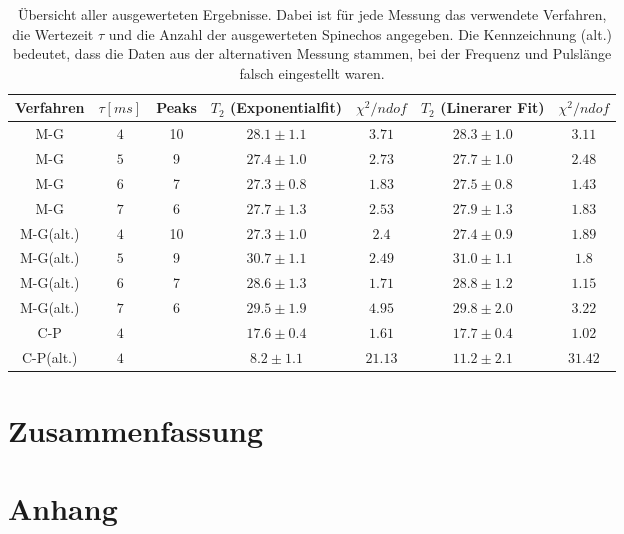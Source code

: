 \documentclass[12pt,a4paper]{article}
\begin{document}
\begin{table}
\begin{tabular}{|c|c|c||c|c||c|c|}
\hline
Verfahren & $\tau [ms]$ & Peaks &  $T_2$ (Exponentialfit) & $\chi^2/ndof$ &$T_2$ (Linerarer Fit) & $\chi^2/ndof$\\
\hline
M-G & $4$ & 10 & $ 28.1 \pm 1.1 $ & $ 3.71 $ & $ 28.3 \pm 1.0 $ & $ 3.11 $ \\
\hline
M-G & $5$ & 9 & $ 27.4 \pm 1.0 $ & $ 2.73 $ & $ 27.7 \pm 1.0 $ & $ 2.48 $ \\
\hline
M-G & $6$ & 7 & $ 27.3 \pm 0.8 $ & $ 1.83 $ & $ 27.5 \pm 0.8 $ & $ 1.43 $ \\
\hline
M-G & $7$ & 6 & $ 27.7 \pm 1.3 $ & $ 2.53 $ & $ 27.9 \pm 1.3 $ & $ 1.83 $ \\
\hline
\hline
M-G(alt.) & $4$ & 10 & $ 27.3 \pm 1.0 $ & $ 2.4 $ & $ 27.4 \pm 0.9 $ & $ 1.89 $ \\
\hline
M-G(alt.) & $5$ & 9 & $ 30.7 \pm 1.1 $ & $ 2.49 $ & $ 31.0 \pm 1.1 $ & $ 1.8 $ \\
\hline
M-G(alt.) & $6$ & 7 & $ 28.6 \pm 1.3 $ & $ 1.71 $ & $ 28.8 \pm 1.2 $ & $ 1.15 $ \\
\hline
M-G(alt.) & $7$ & 6 & $ 29.5 \pm 1.9 $ & $ 4.95 $ & $ 29.8 \pm 2.0 $ & $ 3.22 $ \\
\hline
\hline
C-P & $4$ &  & $17.6\pm 0.4$ & $1.61$ & $17.7\pm 0.4$ & $1.02$\\
\hline
C-P(alt.) & $4$ &  & $ 8.2 \pm 1.1 $ & $ 21.13 $ & $ 11.2 \pm 2.1 $ & $ 31.42 $ \\
\hline
\end{tabular}
\caption{Übersicht aller ausgewerteten Ergebnisse. Dabei ist für jede Messung das verwendete Verfahren, die Wertezeit $\tau$ und die Anzahl der ausgewerteten Spinechos angegeben. Die Kennzeichnung (alt.) bedeutet, dass die Daten aus der alternativen Messung stammen, bei der Frequenz und Pulslänge falsch eingestellt waren.}
\label{T2zusammenfassung}
\end{table}

\section{Zusammenfassung}

\section{Anhang}
\end{document}
